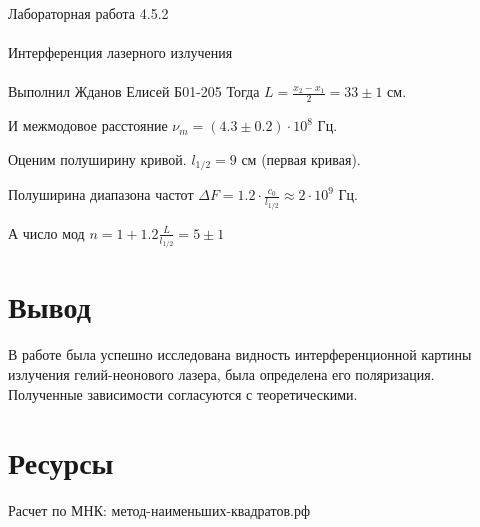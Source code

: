 \documentclass{astroedu-lab}
\begin{document}
\begin{problem}{\huge Лабораторная работа 4.5.2\\\\Интерференция лазерного излучения\\\\Выполнил Жданов Елисей Б01-205}
Тогда $L = \frac{x_2 - x_1}{2} = 33 \pm 1$ см.

И межмодовое расстояние $\nu_m = (4.3 \pm 0.2) \cdot 10^8$ Гц.

Оценим полуширину кривой. $l_{1/2} = 9$ см (первая кривая).

Полуширина диапазона частот $\Delta F = 1.2 \cdot \frac{c_0}{l_{1/2}} \approx 2 \cdot 10^9$ Гц.

А число мод $n = 1 + 1.2 \frac{L}{l_{1/2}} = 5 \pm 1$

\section{Вывод}

В работе была успешно исследована видность  интерференционной картины излучения гелий-неонового лазера, была определена его поляризация. Полученные зависимости согласуются с теоретическими.

\section{Ресурсы}

Расчет по МНК: метод-наименьших-квадратов.рф


\end{problem}
\end{document}
